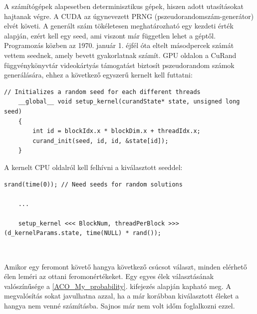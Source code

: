 A számítógépek alapesetben determinisztikus gépek, hiszen adott utasításokat hajtanak végre. A CUDA az úgynevezett PRNG (pszeudorandomszám-generátor) elvét követi. A generált szám tökéletesen meghatározható egy kezdeti érték alapján, ezért kell egy \mbox{seed}, ami viszont már független lehet a géptől. Programozás közben az 1970. január 1. éjfél óta eltelt másodpercek számát vettem seednek, amely bevett gyakorlatnak számít.
GPU oldalon a CuRand függvénykönyvtár videokártyás támogatást biztosít pszeudorandom számok generálására, ehhez a következő egyszerű kernelt kell futtatni:

\begin{lstlisting}[style=CStyle]
	// Initializes a random seed for each different threads
	__global__ void setup_kernel(curandState* state, unsigned long seed)
	{
		int id = blockIdx.x * blockDim.x + threadIdx.x;
		curand_init(seed, id, id, &state[id]);
	}
\end{lstlisting}

A kernelt CPU oldalról kell felhívni a kiválasztott seeddel:

\begin{lstlisting}[style=CStyle]
	srand(time(0)); // Need seeds for random solutions
	
	...
	
	setup_kernel <<< BlockNum, threadPerBlock >>> (d_kernelParams.state, time(NULL) * rand());
\end{lstlisting}

\begin{lstlisting}[style=CStyle,showstringspaces=false]
	
\end{lstlisting}

Amikor egy feromont követő hangya következő csúcsot választ, minden elérhető élen leméri az ottani feromonértékeket. Egy egyes élek választásának valószínűsége a \ref{ACO_My_probability}. kifejezés alapján kapható meg. A megvalósítás sokat javulhatna azzal, ha a már korábban kiválasztott éleket a hangya nem venné számításba. Sajnos már nem volt időm foglalkozni ezzel.

